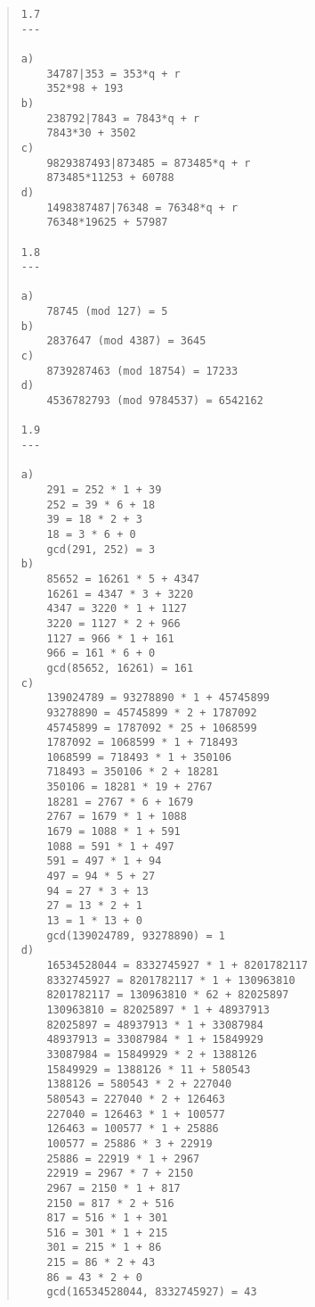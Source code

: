 \documentclass[12pt, a4paper, draft]{report}
\begin{document}
\begin{quote}
\begin{verbatim}
1.7
---

a)
    34787|353 = 353*q + r
    352*98 + 193
b)
    238792|7843 = 7843*q + r
    7843*30 + 3502
c)
    9829387493|873485 = 873485*q + r
    873485*11253 + 60788
d)
    1498387487|76348 = 76348*q + r
    76348*19625 + 57987

1.8
---

a)
    78745 (mod 127) = 5
b)
    2837647 (mod 4387) = 3645
c)
    8739287463 (mod 18754) = 17233
d)
    4536782793 (mod 9784537) = 6542162

1.9
---

a)
    291 = 252 * 1 + 39
    252 = 39 * 6 + 18
    39 = 18 * 2 + 3
    18 = 3 * 6 + 0
    gcd(291, 252) = 3
b)
    85652 = 16261 * 5 + 4347
    16261 = 4347 * 3 + 3220
    4347 = 3220 * 1 + 1127
    3220 = 1127 * 2 + 966
    1127 = 966 * 1 + 161
    966 = 161 * 6 + 0
    gcd(85652, 16261) = 161
c)
    139024789 = 93278890 * 1 + 45745899
    93278890 = 45745899 * 2 + 1787092
    45745899 = 1787092 * 25 + 1068599
    1787092 = 1068599 * 1 + 718493
    1068599 = 718493 * 1 + 350106
    718493 = 350106 * 2 + 18281
    350106 = 18281 * 19 + 2767
    18281 = 2767 * 6 + 1679
    2767 = 1679 * 1 + 1088
    1679 = 1088 * 1 + 591
    1088 = 591 * 1 + 497
    591 = 497 * 1 + 94
    497 = 94 * 5 + 27
    94 = 27 * 3 + 13
    27 = 13 * 2 + 1
    13 = 1 * 13 + 0
    gcd(139024789, 93278890) = 1
d)
    16534528044 = 8332745927 * 1 + 8201782117
    8332745927 = 8201782117 * 1 + 130963810
    8201782117 = 130963810 * 62 + 82025897
    130963810 = 82025897 * 1 + 48937913
    82025897 = 48937913 * 1 + 33087984
    48937913 = 33087984 * 1 + 15849929
    33087984 = 15849929 * 2 + 1388126
    15849929 = 1388126 * 11 + 580543
    1388126 = 580543 * 2 + 227040
    580543 = 227040 * 2 + 126463
    227040 = 126463 * 1 + 100577
    126463 = 100577 * 1 + 25886
    100577 = 25886 * 3 + 22919
    25886 = 22919 * 1 + 2967
    22919 = 2967 * 7 + 2150
    2967 = 2150 * 1 + 817
    2150 = 817 * 2 + 516
    817 = 516 * 1 + 301
    516 = 301 * 1 + 215
    301 = 215 * 1 + 86
    215 = 86 * 2 + 43
    86 = 43 * 2 + 0
    gcd(16534528044, 8332745927) = 43

\end{verbatim}
\end{quote}
\end{document}
